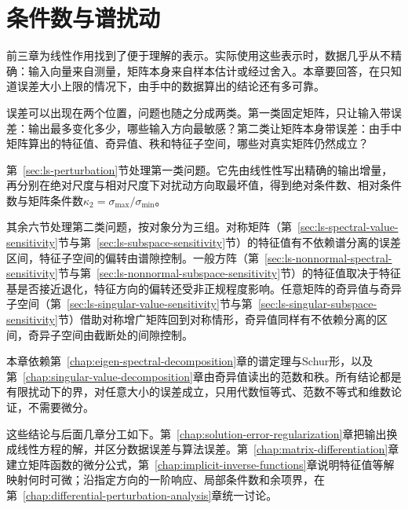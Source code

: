 \chapter{条件数与谱扰动}
\label{chap:condition-and-spectral-perturbation}

前三章为线性作用找到了便于理解的表示。实际使用这些表示时，数据几乎从不精确：输入向量来自测量，矩阵本身来自样本估计或经过舍入。本章要回答，在只知道误差大小上限的情况下，由手中的数据算出的结论还有多可靠。

误差可以出现在两个位置，问题也随之分成两类。第一类固定矩阵，只让输入带误差：输出最多变化多少，哪些输入方向最敏感？第二类让矩阵本身带误差：由手中矩阵算出的特征值、奇异值、秩和特征子空间，哪些对真实矩阵仍然成立？

第~\ref{sec:ls-perturbation}节处理第一类问题。它先由线性性写出精确的输出增量，再分别在绝对尺度与相对尺度下对扰动方向取最坏值，得到绝对条件数、相对条件数与矩阵条件数$\kappa_2=\sigma_{\max}/\sigma_{\min}$。

其余六节处理第二类问题，按对象分为三组。对称矩阵（第~\ref{sec:ls-spectral-value-sensitivity}节与第~\ref{sec:ls-subspace-sensitivity}节）的特征值有不依赖谱分离的误差区间，特征子空间的偏转由谱隙控制。一般方阵（第~\ref{sec:ls-nonnormal-spectral-sensitivity}节与第~\ref{sec:ls-nonnormal-subspace-sensitivity}节）的特征值取决于特征基是否接近退化，特征方向的偏转还受非正规程度影响。任意矩阵的奇异值与奇异子空间（第~\ref{sec:ls-singular-value-sensitivity}节与第~\ref{sec:ls-singular-subspace-sensitivity}节）借助对称增广矩阵回到对称情形，奇异值同样有不依赖分离的区间，奇异子空间由截断处的间隙控制。

本章依赖第~\ref{chap:eigen-spectral-decomposition}章的谱定理与Schur形，以及第~\ref{chap:singular-value-decomposition}章由奇异值读出的范数和秩。所有结论都是有限扰动下的界，对任意大小的误差成立，只用代数恒等式、范数不等式和维数论证，不需要微分。

这些结论与后面几章分工如下。第~\ref{chap:solution-error-regularization}章把输出换成线性方程的解，并区分数据误差与算法误差。第~\ref{chap:matrix-differentiation}章建立矩阵函数的微分公式，第~\ref{chap:implicit-inverse-functions}章说明特征值等解映射何时可微；沿指定方向的一阶响应、局部条件数和余项界，在第~\ref{chap:differential-perturbation-analysis}章统一讨论。


